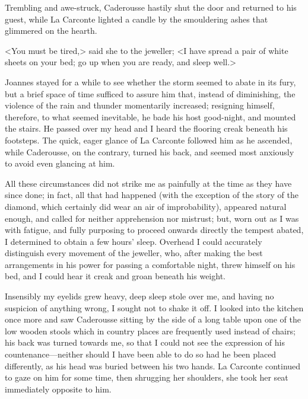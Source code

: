  Trembling and awe-struck, Caderousse hastily shut the door and returned to his guest, while La Carconte lighted a candle by the smouldering ashes that glimmered on the hearth. 

 <You must be tired,> said she to the jeweller; <I have spread a pair of white sheets on your bed; go up when you are ready, and sleep well.> 

 Joannes stayed for a while to see whether the storm seemed to abate in its fury, but a brief space of time sufficed to assure him that, instead of diminishing, the violence of the rain and thunder momentarily increased; resigning himself, therefore, to what seemed inevitable, he bade his host good-night, and mounted the stairs. He passed over my head and I heard the flooring creak beneath his footsteps. The quick, eager glance of La Carconte followed him as he ascended, while Caderousse, on the contrary, turned his back, and seemed most anxiously to avoid even glancing at him. 

 All these circumstances did not strike me as painfully at the time as they have since done; in fact, all that had happened (with the exception of the story of the diamond, which certainly did wear an air of improbability), appeared natural enough, and called for neither apprehension nor mistrust; but, worn out as I was with fatigue, and fully purposing to proceed onwards directly the tempest abated, I determined to obtain a few hours' sleep. Overhead I could accurately distinguish every movement of the jeweller, who, after making the best arrangements in his power for passing a comfortable night, threw himself on his bed, and I could hear it creak and groan beneath his weight. 

 Insensibly my eyelids grew heavy, deep sleep stole over me, and having no suspicion of anything wrong, I sought not to shake it off. I looked into the kitchen once more and saw Caderousse sitting by the side of a long table upon one of the low wooden stools which in country places are frequently used instead of chairs; his back was turned towards me, so that I could not see the expression of his countenance—neither should I have been able to do so had he been placed differently, as his head was buried between his two hands. La Carconte continued to gaze on him for some time, then shrugging her shoulders, she took her seat immediately opposite to him. 

